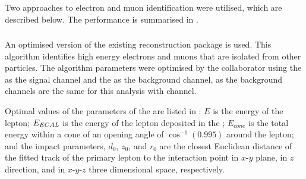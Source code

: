 Two approaches to electron and muon identification were utilised, which are described below. The performance is summarised in .



\subsubsection{\IsolatedLeptonFinderProcessor}
\label{sec:doubleHiggsIsolatedLeptonFinder}
An optimised version of the existing  \IsolatedLeptonFinderProcessor reconstruction package is used. This algorithm identifies high energy electrons and muons that are isolated from other particles. The algorithm parameters were optimised by the collaborator using the \eeToHHbbbb as the signal channel and the \eeTo{ \Pquark \Pquark \Pquark \Pquark \Plepton \Pnu} as the background channel, as the background channels are the same for this analysis with \eeToHHbbWW channel.



Optimal values of the parameters of the \IsolatedLeptonFinderProcessor are listed in : $E$ is the energy of the lepton; $E_{ECAL}$ is the energy of the lepton deposited in the \ECAL; $E_{cone}$ is the total energy within a cone of an opening angle of $\cos^{-1}(0.995)$ around the lepton; and the impact parameters, $d_0$, $z_0$, and $r_0$ are the closest Euclidean distance of the fitted track of the primary lepton to the interaction point  in $x$-$y$ plane, in $z$ direction, and in $x$-$y$-$z$ three dimensional space, respectively.



